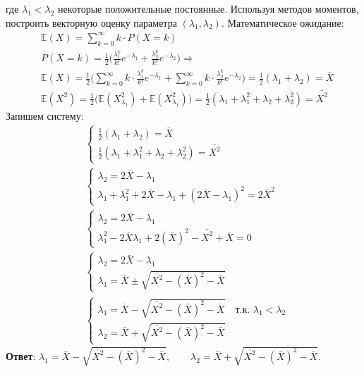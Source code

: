 \documentclass{assignment}
\begin{document}
\begin{enumerate}
    где $\lambda_1 < \lambda_2$ некоторые положительные постоянные. Используя методов моментов, построить векторную оценку параметра $(\lambda_1, \lambda_2)$.
    \start
    Математическое ожидание:
    \begin{align*}
        &\mathbb{E}(X) = \sum_{k=0}^{\infty} k \cdot P(X = k) \\
        &P(X = k) = \frac{1}{2}\Big(\frac{\lambda_1^k}{k!}e^{-\lambda_1} + \frac{\lambda_2^k}{k!}e^{-\lambda_2} \Big) \Rightarrow \\
        &\mathbb{E}(X) = \frac{1}{2}\Big(\sum_{k=0}^{\infty} k \cdot\frac{\lambda_1^k}{k!}e^{-\lambda_1} + \sum_{k=0}^{\infty} k \cdot\frac{\lambda_2^k}{k!}e^{-\lambda_2} \Big) = \frac{1}{2} (\lambda_1 + \lambda_2) = \bar{X} \\
        &\mathbb{E}(X^2) = \frac{1}{2}\Big(\mathbb{E}(X_{\lambda_1}^2) + \mathbb{E}(X_{\lambda_1}^2) \Big) = \frac{1}{2} (\lambda_1 + \lambda_1^2 + \lambda_2 + \lambda_2^2) = \bar{X^2}
    \end{align*}
    Запишем систему:
    \begin{align*}
        &\begin{cases}
            \frac{1}{2} (\lambda_1 + \lambda_2) = \bar{X} \\
            \frac{1}{2} (\lambda_1 + \lambda_1^2 + \lambda_2 + \lambda_2^2) = \bar{X^2}
        \end{cases} \\
        &\begin{cases}
            \lambda_2 = 2\bar{X} - \lambda_1 \\
            \lambda_1 + \lambda_1^2 + 2\bar{X} - \lambda_1 + (2\bar{X} - \lambda_1)^2 = 2\bar{X}^2
        \end{cases} \\
        &\begin{cases}
            \lambda_2 = 2\bar{X} - \lambda_1 \\
            \lambda_1^2 - 2\bar{X}\lambda_1 + 2(\bar{X})^2 - \bar{X^2} + \bar{X} = 0
        \end{cases} \\
        &\begin{cases}
            \lambda_2 = 2\bar{X} - \lambda_1 \\
            \lambda_1 = \bar{X} \pm \sqrt{\bar{X^2}-(\bar{X})^2-\bar{X}}
        \end{cases} \\
        &\begin{cases}
            \lambda_1 = \bar{X} - \sqrt{\bar{X^2}-(\bar{X})^2-\bar{X}} \quad \text{т.к. } \lambda_1 < \lambda_2\\
            \lambda_2 = \bar{X} + \sqrt{\bar{X^2}-(\bar{X})^2-\bar{X}}
        \end{cases}
    \end{align*}
    \textbf{Ответ}: $\lambda_1 = \bar{X} - \sqrt{\bar{X^2}-(\bar{X})^2-\bar{X}}, \qquad \lambda_2 = \bar{X} + \sqrt{\bar{X^2}-(\bar{X})^2-\bar{X}}$.
    \finish
    

\end{enumerate}
\end{document}
